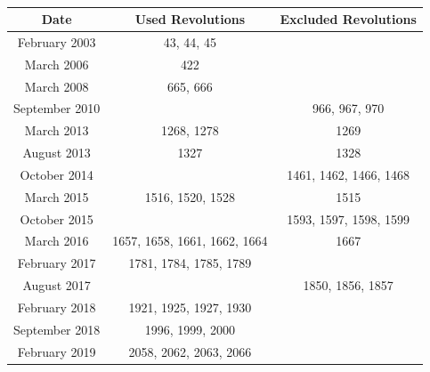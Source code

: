 \documentclass{report}
\begin{document}
\begin{table}[h] 
  \begin{center}
  \begin{tabular}{|c|c|c|}
  \hline
  \textbf{Date}  & \textbf{Used Revolutions}    & \textbf{Excluded Revolutions} \\ \hline
  February 2003   & 43, 44, 45                   &                               \\ \hline
  March 2006     & 422                          &                               \\ \hline
  March 2008     & 665, 666                     &                               \\ \hline
  September 2010 &                              & 966, 967, 970                 \\ \hline
  March 2013     & 1268, 1278                   & 1269                          \\ \hline
  August 2013    & 1327                         & 1328                          \\ \hline
  October 2014   &                              & 1461, 1462, 1466, 1468        \\ \hline
  March 2015     & 1516, 1520, 1528             & 1515                          \\ \hline
  October 2015   &                              & 1593, 1597, 1598, 1599        \\ \hline
  March 2016     & 1657, 1658, 1661, 1662, 1664 & 1667                          \\ \hline
  February 2017  & 1781, 1784, 1785, 1789       &                               \\ \hline
  August 2017    &                              & 1850, 1856, 1857              \\ \hline
  February 2018  & 1921, 1925, 1927, 1930       &                               \\ \hline
  September 2018 & 1996, 1999, 2000             &                               \\ \hline
  February 2019  & 2058, 2062, 2063, 2066       &                               \\ \hline
  \end{tabular}
  \end{center}
  \caption{}
  \label{tab excl revs}
\end{table}

\FloatBarrier
\end{document}
